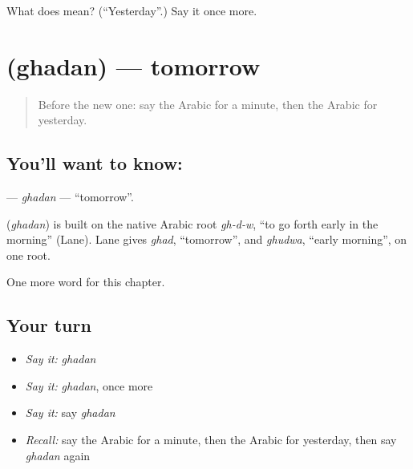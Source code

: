 \begin{tcolorbox}[breakable,colback=teal!4,colframe=teal!35!black,title={Before you move on}]
What does  mean? (\textquotedblleft{}Yesterday\textquotedblright{}.) Say it once more.
\end{tcolorbox}
\section[\texorpdfstring{\ar{غدا} (ghadan)}{غدا (ghadan)}]{ (ghadan) — tomorrow}

\label{lesson:AR-C87-ghadan}



\begin{quote}
Before the new one: say the Arabic for a minute, then the Arabic for yesterday.
\end{quote}

\subsection*{You'll want to know: }
\textbf{} — \emph{ghadan} — \textquotedblleft{}tomorrow\textquotedblright{}.

\begin{cousinweb}
\textbf{} (\emph{ghadan}) is built on the native Arabic root \emph{gh-d-w}, \textquotedblleft{}to go forth early in the morning\textquotedblright{} (Lane). Lane gives \emph{ghad}, \textquotedblleft{}tomorrow\textquotedblright{}, and \emph{ghudwa}, \textquotedblleft{}early morning\textquotedblright{}, on one root.
\end{cousinweb}

\begin{grammarlens}[title={What you've built}]
One more word for this chapter.
\end{grammarlens}

\subsection*{Your turn}
\begin{itemize}
\raggedright
  \item \emph{Say it:} \emph{ghadan}
  \item \emph{Say it:} \emph{ghadan}, once more
  \item \emph{Say it:} say \emph{ghadan}
  \item \emph{Recall:} say the Arabic for a minute, then the Arabic for yesterday, then say \emph{ghadan} again
\end{itemize}

